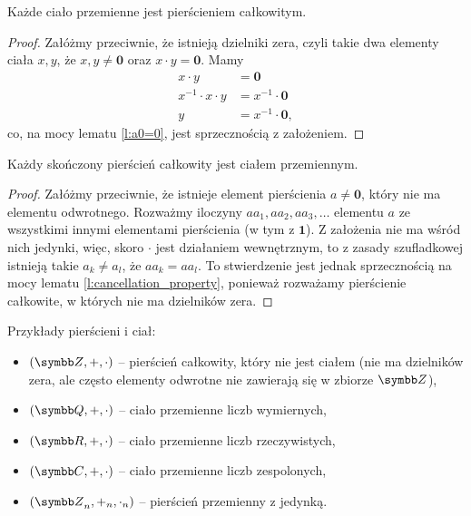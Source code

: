 \begin{theorem}
    Każde ciało przemienne jest pierścieniem całkowitym.
\end{theorem}
\begin{proof}
    Załóżmy przeciwnie, że istnieją dzielniki zera, czyli takie dwa elementy ciała $x, y$, że $x, y \neq \symbf{0}$ oraz $x \cdot y = \symbf{0}$. Mamy
    \begin{align*}
        x \cdot y &= \symbf{0} \\
        x^{-1} \cdot x \cdot y &= x^{-1} \cdot \symbf{0} \\
        y &= x^{-1} \cdot \symbf{0},
    \end{align*}
    co, na mocy lematu \ref{l:a0=0}, jest sprzecznością z założeniem.
\end{proof}

\begin{theorem}
    Każdy skończony pierścień całkowity jest ciałem przemiennym.
\end{theorem}
\begin{proof}
    Załóżmy przeciwnie, że istnieje element pierścienia $a \neq \symbf{0}$, który nie ma elementu odwrotnego. Rozważmy iloczyny $aa_1, aa_2, aa_3, \ldots$ elementu $a$ ze wszystkimi innymi elementami pierścienia (w tym z $\symbf{1}$). Z założenia nie ma wśród nich jedynki, więc, skoro $\cdot$ jest działaniem wewnętrznym, to z zasady szufladkowej istnieją takie $a_k \neq a_l$, że $aa_k = aa_l$. To stwierdzenie jest jednak sprzecznością na mocy lematu \ref{l:cancellation_property}, ponieważ rozważamy pierścienie całkowite, w których nie ma dzielników zera.
\end{proof}

\begin{example}
    Przykłady pierścieni i ciał:
    \begin{itemize}
        \item $(\ZZ, +, \cdot)$ -- pierścień całkowity, który nie jest ciałem (nie ma dzielników zera, ale często elementy odwrotne nie zawierają się w zbiorze $\ZZ$),
        \item $(\QQ, +, \cdot)$ -- ciało przemienne liczb wymiernych,
        \item $(\RR, +, \cdot)$ -- ciało przemienne liczb rzeczywistych,
        \item $(\CC, +, \cdot)$ -- ciało przemienne liczb zespolonych,
        \item $(\ZZ_n, +_n, \cdot_n)$ -- pierścień przemienny z jedynką.
    \end{itemize}
\end{example}

